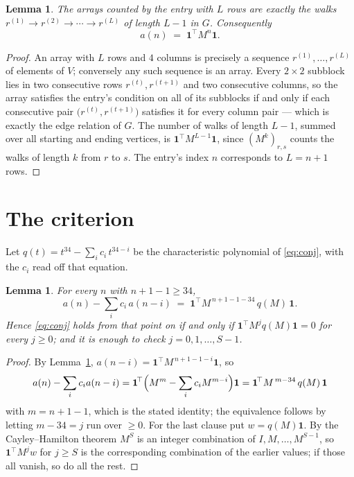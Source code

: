 \documentclass[11pt,a4paper]{article}
\theoremstyle{plain}
\newtheorem{lemma}[theorem]{Lemma}
\theoremstyle{definition}
\begin{document}
\begin{lemma}\label{lem:walk}
The arrays counted by the entry with $L$ rows are exactly the walks
$r^{(1)}\to r^{(2)}\to\cdots\to r^{(L)}$ of length $L-1$ in $G$. Consequently
\[
a(n)\;=\;\mathbf{1}^{\!\top}M^{n}\mathbf{1} .
\]
\end{lemma}

\begin{proof}
An array with $L$ rows and $4$ columns is precisely a sequence
$r^{(1)},\dots,r^{(L)}$ of elements of $V$; conversely any such sequence is an array.
Every $2\times2$ subblock lies in two consecutive rows $r^{(t)},r^{(t+1)}$ and two
consecutive columns, so the array satisfies the entry's condition on all of its subblocks
if and only if each consecutive pair $\bigl(r^{(t)},r^{(t+1)}\bigr)$ satisfies it for
every column pair --- which is exactly the edge relation of $G$. The number of walks of
length $L-1$, summed over all starting and ending vertices, is
$\mathbf{1}^{\!\top}M^{L-1}\mathbf{1}$, since $(M^{k})_{r,s}$ counts the walks of
length $k$ from $r$ to $s$. The entry's index $n$ corresponds to $L=n+1$ rows.
\end{proof}

\section{The criterion}

Let $q(t)=t^{34}-\sum_i c_i\,t^{34-i}$ be the characteristic polynomial of
\eqref{eq:conj}, with the $c_i$ read off that equation.

\begin{lemma}\label{lem:crit}
For every $n$ with $n+1-1\ge34$,
\[
a(n)-\sum_i c_i\,a(n-i)\;=\;\mathbf{1}^{\!\top}M^{\,n+1-1-34}\,q(M)\,\mathbf{1} .
\]
Hence \eqref{eq:conj} holds from that point on if and only if
$\mathbf{1}^{\!\top}M^{j}q(M)\mathbf{1}=0$ for every $j\ge0$; and it is enough to check
$j=0,1,\dots,S-1$.
\end{lemma}

\begin{proof}
By Lemma~\ref{lem:walk}, $a(n-i)=\mathbf{1}^{\!\top}M^{\,n+1-1-i}\mathbf{1}$, so
\[
a(n)-\sum_i c_i a(n-i)
=\mathbf{1}^{\!\top}\Bigl(M^{m}-\sum_i c_i M^{m-i}\Bigr)\mathbf{1}
=\mathbf{1}^{\!\top}M^{\,m-34}\,q(M)\,\mathbf{1}
\]
with $m=n+1-1$, which is the stated identity; the equivalence follows by letting
$m-34=j$ run over $\ge0$. For the last clause put $w=q(M)\mathbf{1}$. By the
Cayley--Hamilton theorem $M^{S}$ is an integer combination of $I,M,\dots,M^{S-1}$, so
$\mathbf{1}^{\!\top}M^{j}w$ for $j\ge S$ is the corresponding combination of the earlier
values; if those all vanish, so do all the rest.
\end{proof}
\end{document}
